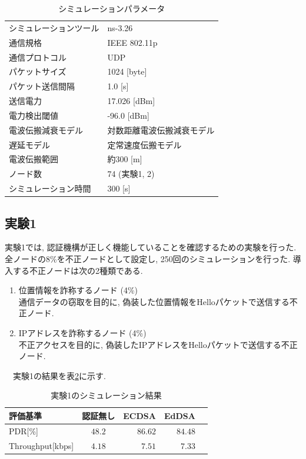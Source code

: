 \documentclass[a4j,9pt,twocolumn]{jsarticle}
\begin{document}
\begin{table}[h]
  \centering
  \caption{シミュレーションパラメータ}
  \label{tab:parameter}
  \begin{tabular}{ll} \hline
    シミュレーションツール & ns-3.26 \\
    通信規格 & IEEE 802.11p \\
    通信プロトコル & UDP \\
    パケットサイズ & 1024 [byte] \\
    パケット送信間隔 & 1.0 [s] \\
    送信電力 & 17.026 [dBm] \\
    電力検出閾値 & -96.0 [dBm] \\
    電波伝搬減衰モデル & 対数距離電波伝搬減衰モデル \\
    遅延モデル & 定常速度伝搬モデル \\
    電波伝搬範囲 & 約300 [m] \\
    ノード数 & 74 (実験1, 2)\\
    シミュレーション時間 & 300 [s] \\ \hline
  \end{tabular}
\end{table}
\subsection{実験1}
実験1では, 認証機構が正しく機能していることを確認するための実験を行った. 
全ノードの8\%を不正ノードとして設定し, 250回のシミュレーションを行った. 
導入する不正ノードは次の2種類である. 
\begin{enumerate}
    \item 位置情報を詐称するノード (4\%)\\
    通信データの窃取を目的に, 偽装した位置情報をHelloパケットで送信する不正ノード. 
    \item IPアドレスを詐称するノード (4\%)\\
    不正アクセスを目的に, 偽装したIPアドレスをHelloパケットで送信する不正ノード. 
\end{enumerate}
\medskip
　実験1の結果を表\ref{tab:exp1}に示す.
\vspace{-2mm}
\begin{table}[h]
    \centering
    \caption{実験1のシミュレーション結果}
    \label{tab:exp1} 
    \begin{tabular}{l|crrr} \hline
        評価基準 & 認証無し & ECDSA & EdDSA \\ \hline \hline
        PDR[\%] & $48.2$ & $86.62$ & $84.48$ \\
        Throughput[kbps] & $4.18$ & $7.51$ & $7.33$ \\ \hline
    \end{tabular}
\end{table}
\end{document}
